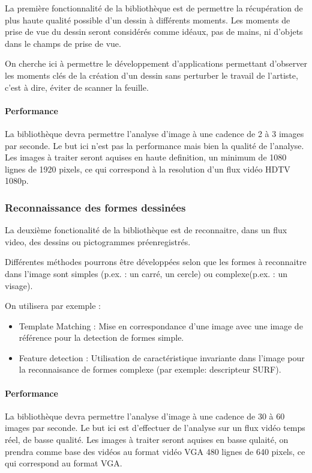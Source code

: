 La première fonctionnalité de la bibliothèque est de permettre la récupération de plus haute qualité possible d’un dessin à différents moments. Les moments de prise de vue du dessin seront considérés comme idéaux, pas de mains, ni d'objets dans le champs de prise de vue.

On cherche ici à permettre le développement d'applications permettant d'observer les moments clés de la création d'un dessin sans perturber le travail de l'artiste, c'est à dire, éviter de scanner la feuille.

\paragraph{Performance\\}
La bibliothèque devra permettre l'analyse d'image à une cadence de 2 à 3 images par seconde. Le but ici n'est pas la performance mais bien la qualité de l'analyse.
Les images à traiter seront aquises en haute definition, un minimum de 1080 lignes de 1920 pixels, ce qui correspond à la resolution d'un flux vidéo HDTV 1080p.


\subsubsection{Reconnaissance des formes dessinées\\}
La deuxième fonctionalité de la bibliothèque est de reconnaitre, dans un flux video, des dessins ou pictogrammes préenregistrés. 

Différentes méthodes pourrons être développées selon que les formes à reconnaitre dans l'image sont simples (p.ex. : un carré, un cercle) ou complexe(p.ex. : un visage).

On utilisera par exemple :

\begin{itemize}
\item Template Matching : Mise en correspondance d'une image avec une image de référence pour la detection de formes simple.
\item Feature detection : Utilisation de caractéristique invariante dans l'image pour la reconnaisance de formes complexe (par exemple: descripteur SURF).
\end{itemize}

\paragraph{Performance\\}
La bibliothèque devra permettre l'analyse d'image à une cadence de 30 à 60 images par seconde. Le but ici est d'effectuer de l'analyse sur un flux vidéo temps réel, de basse qualité.
Les images à traiter seront aquises en basse qulaité, on prendra comme base des vidéos au format vidéo VGA 480 lignes de 640 pixels, ce qui correspond au format VGA.



